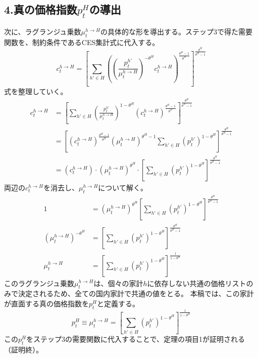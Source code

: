 \subsection*{4.真の価格指数\(p_t^H\)の導出}
\label{sec:appendix_cost_minimization_sub4}
次に、ラグランジュ乗数\(\mu_t^{h\to H}\)の具体的な形を導出する。ステップ3で得た需要関数を、制約条件であるCES集計式に代入する。
\begin{equation}
c_t^{h\to H}=\left[\sum_{h'\in H}\left(\left(\frac{p_t^{h'}}{\mu_t^{h\to H}}\right)^{-\theta^H}c_t^{h\to H}\right)^{\frac{\theta^H-1}{\theta^H}}\right]^{\frac{\theta^H}{\theta^H-1}}
\label{eq:appendix_cost_minimization_sub4_ces_substitution}
\end{equation}
式を整理していく。
\begin{align}
    c_t^{h\to H}&=\left[\sum_{h'\in H}\left(\frac{p_t^{h'}}{\mu_t^{h\to H}}\right)^{1-\theta^H}(c_t^{h\to H})^{\frac{\theta^H-1}{\theta^H}}\right]^{\frac{\theta^H}{\theta^H-1}} \label{eq:appendix_cost_minimization_sub4_ces_step1} \\
    &=\left[(c_t^{h\to H})^{\frac{\theta^H-1}{\theta^H}}(\mu_t^{h\to H})^{\theta^H-1}\sum_{h'\in H}(p_t^{h'})^{1-\theta^H}\right]^{\frac{\theta^H}{\theta^H-1}} \label{eq:appendix_cost_minimization_sub4_ces_step2} \\
    &=(c_t^{h\to H})\cdot(\mu_t^{h\to H})^{\theta^H}\cdot\left[\sum_{h'\in H}(p_t^{h'})^{1-\theta^H}\right]^{\frac{\theta^H}{\theta^H-1}}
    \label{eq:appendix_cost_minimization_sub4_ces_final}
\end{align}
両辺の\(c_t^{h\to H}\)を消去し、\(\mu_t^{h\to H}\)について解く。
\begin{align}
    1&=(\mu_t^{h\to H})^{\theta^H}\left[\sum_{h'\in H}(p_t^{h'})^{1-\theta^H}\right]^{\frac{\theta^H}{\theta^H-1}} \label{eq:appendix_cost_minimization_sub4_mult_step1} \\
    (\mu_t^{h\to H})^{-\theta^H}&=\left[\sum_{h'\in H}(p_t^{h'})^{1-\theta^H}\right]^{\frac{\theta^H}{\theta^H-1}} \label{eq:appendix_cost_minimization_sub4_mult_step2} \\
    \mu_t^{h\to H}&=\left[\sum_{h'\in H}(p_t^{h'})^{1-\theta^H}\right]^{\frac{1}{1-\theta^H}}
    \label{eq:appendix_cost_minimization_sub4_mult_final}
\end{align}
このラグランジュ乗数\(\mu_t^{h\to H}\)は、個々の家計\(h\)に依存しない共通の価格リストのみで決定されるため、全ての国内家計で共通の値をとる。
本稿では、この家計が直面する真の価格指数を\(p_t^H\)と定義する。
\begin{equation}
p_t^H\equiv\mu_t^{h\to H}=\left[\sum_{h'\in H}(p_t^{h'})^{1-\theta^H}\right]^{\frac{1}{1-\theta^H}}
\label{eq:appendix_cost_minimization_sub4_price_index_def}
\end{equation}
この\(p_t^H\)をステップ3の需要関数に代入することで、定理の項目1が証明される（証明終）。